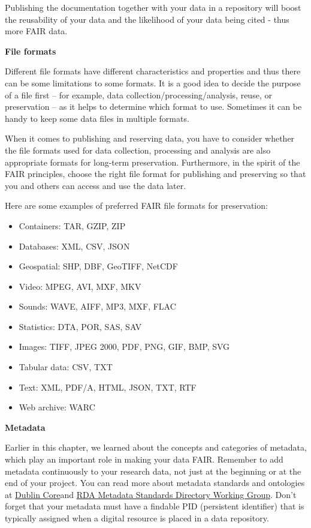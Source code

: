 \documentclass[
]{book}
\providecommand{\tightlist}{%
  \setlength{\itemsep}{0pt}\setlength{\parskip}{0pt}}
\begin{document}
Publishing the documentation together with your data in a repository will boost the reusability of your data and the likelihood of your data being cited - thus more FAIR data.

\textbf{File formats}

Different file formats have different characteristics and properties and thus there can be some limitations to some formats. It is a good idea to decide the purpose of a file first -- for example, data collection/processing/analysis, reuse, or preservation -- as it helps to determine which format to use. Sometimes it can be handy to keep some data files in multiple formats.

When it comes to publishing and reserving data, you have to consider whether the file formats used for data collection, processing and analysis are also appropriate formats for long-term preservation. Furthermore, in the spirit of the FAIR principles, choose the right file format for publishing and preserving so that you and others can access and use the data later.

Here are some examples of preferred FAIR file formats for preservation:

\begin{itemize}
\tightlist
\item
  Containers: TAR, GZIP, ZIP
\item
  Databases: XML, CSV, JSON
\item
  Geospatial: SHP, DBF, GeoTIFF, NetCDF
\item
  Video: MPEG, AVI, MXF, MKV
\item
  Sounds: WAVE, AIFF, MP3, MXF, FLAC
\item
  Statistics: DTA, POR, SAS, SAV
\item
  Images: TIFF, JPEG 2000, PDF, PNG, GIF, BMP, SVG
\item
  Tabular data: CSV, TXT
\item
  Text: XML, PDF/A, HTML, JSON, TXT, RTF
\item
  Web archive: WARC
\end{itemize}

\textbf{Metadata}

Earlier in this chapter, we learned about the concepts and categories of metadata, which play an important role in making your data FAIR. Remember to add metadata continuously to your research data, not just at the beginning or at the end of your project. You can read more about metadata standards and ontologies at \href{https://www.dublincore.org/}{Dublin Core}and \href{http://rd-alliance.github.io/metadata-directory/}{RDA Metadata Standards Directory Working Group}. Don't forget that your metadata must have a findable PID (persistent identifier) that is typically assigned when a digital resource is placed in a data repository.
\end{document}
